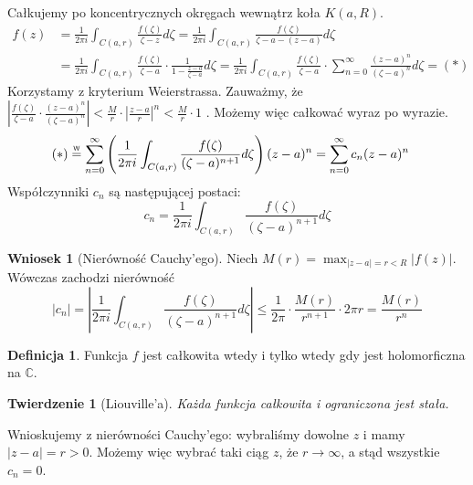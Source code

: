 \documentclass[11pt]{article}
\newcommand{\abs}[1]{\left|#1\right|} %
\newcommand{\eqtext}[1]{\overset{\text{\tiny\sffamily #1}}{=}} %
\theoremstyle{plain}
\newtheorem*{theorem}{Twierdzenie}
\theoremstyle{definition}
\newtheorem*{definition}{Definicja}
\newtheorem*{corollary}{Wniosek}
\theoremstyle{remark}
\let\oldendproof\endproof
\renewenvironment{proof}[1][\proofname]{
  \oldproof[\textsc{\small #1}]
}{\oldendproof}
\begin{document}
\begin{proof}
  Całkujemy po koncentrycznych okręgach wewnątrz koła $ K(a, R) $.
  \begin{align*}
    f(z) &
    = \frac{1}{2 \pi i} \int_{C(a, r)} \frac{f(\zeta)}{\zeta-z} d\zeta
    = \frac{1}{2 \pi i} \int_{C(a, r)} \frac{f(\zeta)}{\zeta-a-(z-a)} d\zeta \\ &
    = \frac{1}{2 \pi i} \int_{C(a, r)} \frac{f(\zeta)}{\zeta-a} \cdot \frac{1}{1 - \frac{z-a}{\zeta-a}} d\zeta
    = \frac{1}{2 \pi i} \int_{C(a, r)} \frac{f(\zeta)}{\zeta-a} \cdot \sum_{n=0}^{\infty} \frac{(z-a)^{n}}{(\zeta-a)^{n}} d\zeta = (*)
  \end{align*}
  Korzystamy z kryterium Weierstrassa. Zauważmy, że
  $
    \abs{\frac{f(\zeta)}{\zeta-a} \cdot \frac{(z-a)^{n}}{(\zeta-a)^{n}}}
    < \frac{M}{r} \cdot \abs{\frac{z-a}{r}}^n
    < \frac{M}{r} \cdot 1
  $
  . Możemy więc całkować wyraz po wyrazie.
  \begin{align*}
    (*) &
    \eqtext{W} \sum_{n=0}^{\infty} \left( \frac{1}{2 \pi i} \int_{C(a, r)} \frac{f(\zeta)}{(\zeta-a)^{n+1}} d\zeta \right)(z-a)^{n}
    = \sum_{n = 0}^{\infty} c_{n}(z-a)^{n}
  \end{align*}
  Współczynniki $ c_{n} $ są następującej postaci:
  $$
    c_{n} = \frac{1}{2 \pi i} \int_{C(a, r)} \frac{f(\zeta)}{(\zeta-a)^{n+1}} d\zeta
  $$
\end{proof}

\begin{corollary}[Nierówność Cauchy'ego]
  Niech $ M(r) = \max_{\abs{z-a} = r < R} \abs{f(z)} $. Wówczas zachodzi nierówność
  $$ \abs{c_{n}} = \abs{ \frac{1}{2 \pi i} \int_{C(a, r)} \frac{f(\zeta)}{(\zeta-a)^{n+1}} d\zeta } \leq \frac{1}{2 \pi} \cdot \frac{M(r)}{r^{n+1}} \cdot 2 \pi r = \frac{M(r)}{r^n} $$
\end{corollary}

\begin{definition}
  Funkcja $ f $ jest całkowita wtedy i tylko wtedy gdy jest holomorficzna na $ \mathbb{C} $.
\end{definition}

\begin{theorem}[Liouville'a]
  Każda funkcja całkowita i ograniczona jest stała.
\end{theorem}

\begin{proof}
  Wnioskujemy z nierówności Cauchy'ego: wybraliśmy dowolne $ z $ i mamy $ \abs{z-a} = r > 0 $. Możemy więc wybrać taki ciąg $ z $, że $ r \to \infty $, a stąd wszystkie $ c_{n} = 0 $. 
\end{proof}
\end{document}
